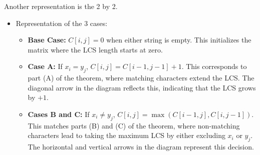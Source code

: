 \begin{definition}
    Another representation is the 2 by 2. 
    \begin{itemize}
        \item Representation of the 3 cases: 

        \begin{itemize}
            \item \textbf{Base Case:} $C[i,j] = 0$ when either string is empty. This initializes the matrix where the LCS length starts at zero.
            
            \item \textbf{Case A:} If $x_i = y_j$, $C[i,j] = C[i-1, j-1] + 1$. This corresponds to part (A) of the theorem, where matching characters extend the LCS. The diagonal arrow in the diagram reflects this, indicating that the LCS grows by $+1$.
            
            \item \textbf{Cases B and C:} If $x_i \neq y_j$, $C[i,j] = \max(C[i-1, j], C[i, j-1])$. This matches parts (B) and (C) of the theorem, where non-matching characters lead to taking the maximum LCS by either excluding $x_i$ or $y_j$. The horizontal and vertical arrows in the diagram represent this decision.
        \end{itemize}

    \end{itemize}
\end{definition}

